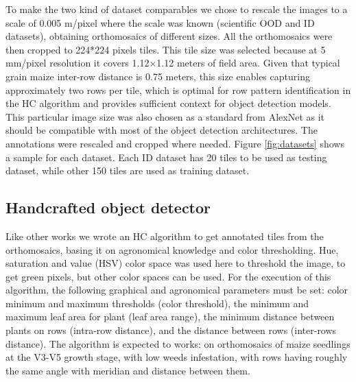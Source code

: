 \documentclass[12pt,a4paper,oneside]{report}
\begin{document}
To make the two kind of dataset comparables we chose to rescale the images to a scale of 0.005 m/pixel
where the scale was known (scientific OOD and ID datasets), obtaining orthomosaics of different sizes.
All the orthomosaics were then cropped to 224*224 pixels tiles.
This tile size was selected because at 5 mm/pixel resolution it covers 1.12×1.12 meters of field area.
Given that typical grain maize inter-row distance is 0.75 meters, this size enables capturing 
approximately two rows per tile, which is optimal for row pattern identification in the HC algorithm 
and provides sufficient context for object detection models.
This particular image size was also chosen as a standard from AlexNet \cite{krizhevskyImageNetClassificationDeep2012}
as it should be compatible with most of the object detection architectures.
The annotations were rescaled and cropped where needed.
Figure \ref{fig:datasets} shows a sample for each dataset.
Each ID dataset has 20 tiles to be used as testing dataset, while other 
150 tiles are used as training dataset.

\subsection{Handcrafted object detector}

Like other works \cite{davidPlantDetectionCounting2021,garcia-martinezDigitalCountCorn2020,liuEstimatingMaizeSeedling2022} 
we wrote an HC algorithm to get annotated tiles from the orthomosaics, 
basing it on agronomical knowledge and color thresholding.
Hue, saturation and value (HSV) color space was used here to threshold the image,
to get green pixels, but other color spaces can be used.
For the execution of this algorithm, the following graphical and agronomical 
parameters must be set: color minimum and maximum thresholds (color threshold), the minimum and maximum 
leaf area for plant (leaf area range), the minimum distance between plants on rows (intra-row distance),
and the distance between rows (inter-rows distance). 
The algorithm is expected to works: on orthomosaics of maize seedlings at the V3-V5 growth stage,
with low weeds infestation, with rows having roughly the same angle with meridian and distance between them.
\end{document}
